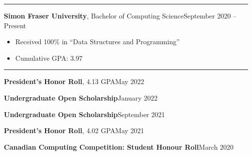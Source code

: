 \documentclass{article}
\newcommand{\entrytitlesimple}[2]{\vspace{0.5em}\textbf{#1}\hfill #2}
\newcommand{\entrytitleskip}{\par\vspace{-0.7em}}
\newcommand{\entrytitle}[3]{\vspace{0.5em}\textbf{#1}, {\small #2}\hfill #3}
\renewcommand{\section}[1]{\vspace{1em}{\Large #1}\vspace{0.3em}\hrule}
\newenvironment{entrybody}{\begin{itemize}[itemsep=0.3em]}{\end{itemize}}
\begin{document}
\section{Education}

\entrytitle{Simon Fraser University}{Bachelor of Computing Science}{September 2020 – Present}
\begin{entrybody}
\item Received 100\% in ``Data Structures and Programming''
\item Cumulative GPA: 3.97
\end{entrybody}


\section{Awards}

\entrytitle{President's Honor Roll}{4.13 GPA}{May 2022} \entrytitleskip
\entrytitlesimple{Undergraduate Open Scholarship}{January 2022} \entrytitleskip
\entrytitlesimple{Undergraduate Open Scholarship}{September 2021} \entrytitleskip
\entrytitle{President's Honor Roll}{4.02 GPA}{May 2021} \entrytitleskip
\entrytitlesimple{Canadian Computing Competition: Student Honour Roll}{March 2020}
\end{document}
